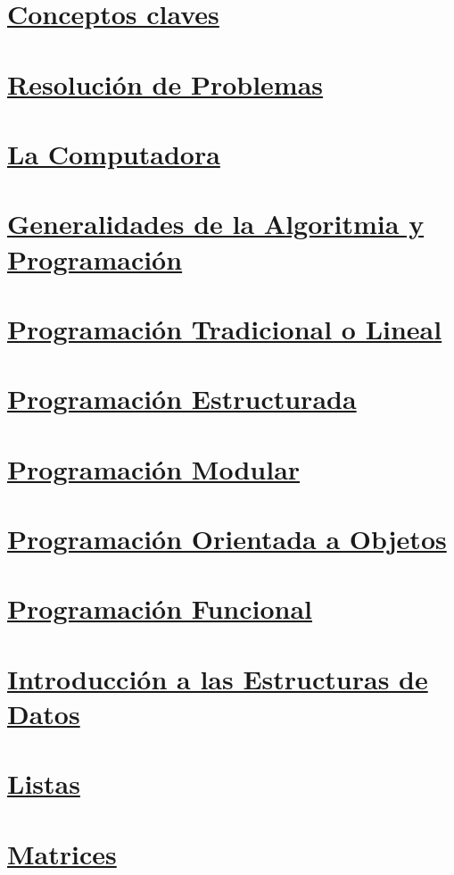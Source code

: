 \documentclass[a4paper, 12pt]{article}
\begin{document}
    \newpage\section*{\textbf{\underline{Conceptos claves}}}
    \newpage\section*{\textbf{\underline{Resolución de Problemas}}}
    \newpage\section*{\textbf{\underline{La Computadora}}}
    \newpage\section*{\textbf{\underline{Generalidades de la Algoritmia y Programación}}}
    \newpage\section*{\textbf{\underline{Programación Tradicional o Lineal}}}
    \newpage\section*{\textbf{\underline{Programación Estructurada}}}
    \newpage\section*{\textbf{\underline{Programación Modular}}}
    \newpage\section*{\textbf{\underline{Programación Orientada a Objetos}}}
    \newpage\section*{\textbf{\underline{Programación Funcional}}}
    \newpage\section*{\textbf{\underline{Introducción a las Estructuras de Datos}}}
    \newpage\section*{\textbf{\underline{Listas}}}
    \newpage\section*{\textbf{\underline{Matrices}}}
\end{document}
